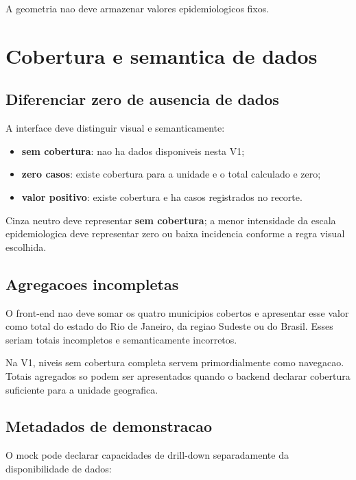 \documentclass[12pt,a4paper]{article}
\begin{document}
A geometria nao deve armazenar valores epidemiologicos fixos.

\section{Cobertura e semantica de dados}

\subsection{Diferenciar zero de ausencia de dados}

A interface deve distinguir visual e semanticamente:

\begin{itemize}[leftmargin=*]
    \item \textbf{sem cobertura}: nao ha dados disponiveis nesta V1;
    \item \textbf{zero casos}: existe cobertura para a unidade e o total calculado e zero;
    \item \textbf{valor positivo}: existe cobertura e ha casos registrados no recorte.
\end{itemize}

Cinza neutro deve representar \textbf{sem cobertura}; a menor intensidade da escala epidemiologica deve representar zero ou baixa incidencia conforme a regra visual escolhida.

\subsection{Agregacoes incompletas}

\begin{warningbox}
O front-end nao deve somar os quatro municipios cobertos e apresentar esse valor como total do estado do Rio de Janeiro, da regiao Sudeste ou do Brasil. Esses seriam totais incompletos e semanticamente incorretos.
\end{warningbox}

Na V1, niveis sem cobertura completa servem primordialmente como navegacao. Totais agregados so podem ser apresentados quando o backend declarar cobertura suficiente para a unidade geografica.

\subsection{Metadados de demonstracao}

O mock pode declarar capacidades de drill-down separadamente da disponibilidade de dados:
\end{document}
